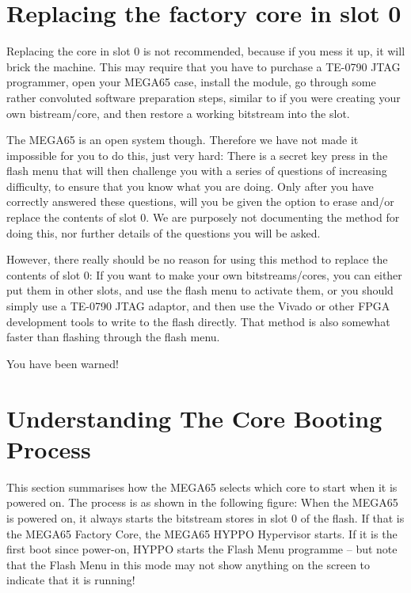 \section{Replacing the factory core in slot 0}

Replacing the core in slot 0 is not recommended, because if you mess it up, it will brick the machine.
This may require that you have to purchase a TE-0790 JTAG programmer, open your MEGA65 case, install
the module, go through some rather convoluted software preparation steps, similar to if you were
creating your own bistream/core, and then restore a working bitstream into the slot.

The MEGA65 is an open system though. Therefore we have not made it impossible for you to do this,
just very hard: There
is a secret key press in the flash menu that will then challenge you with a series of questions of
increasing difficulty, to ensure that you know what you are doing.  Only after you have correctly
answered these questions, will you be given the option to erase and/or replace the contents of slot 0.
We are purposely not documenting the method for doing this, nor further details of the questions
you will be asked.

However, there really should be no reason for using this method to replace the contents of slot 0:
If you want to make your own bitstreams/cores, you can either put them in other slots, and use the
flash menu to activate them, or you should simply use a TE-0790 JTAG adaptor, and then use
the Vivado or other FPGA development tools to write to the flash directly.  That method is also
somewhat faster than flashing through the flash menu.

You have been warned!

\section{Understanding The Core Booting Process}

This section summarises how the MEGA65 selects which core to start when it is powered on.
The process is as shown in the following figure: When the MEGA65 is
powered on, it always starts the bitstream stores in slot 0 of the
flash.  If that is the MEGA65 Factory Core, the MEGA65 HYPPO
Hypervisor starts.  If it is the first boot since power-on, HYPPO
starts the Flash Menu programme -- but note that the Flash Menu in
this mode may not show anything on the screen to indicate that it is
running!

